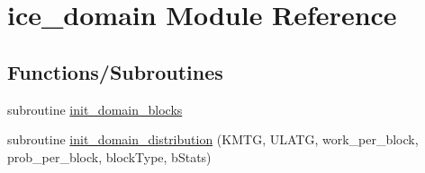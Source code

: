 \hypertarget{namespaceice__domain}{
\section{ice\_\-domain Module Reference}
\label{namespaceice__domain}
}
\subsection*{Functions/Subroutines}
\begin{DoxyCompactItemize}
\item 
subroutine \hyperlink{namespaceice__domain_a110521a564e05165f28b634bd881455c}{init\_\-domain\_\-blocks}
\item 
subroutine \hyperlink{namespaceice__domain_a1beac4cd1574f731cb07cd1f7d20f724}{init\_\-domain\_\-distribution} (KMTG, ULATG, work\_\-per\_\-block, prob\_\-per\_\-block, blockType, bStats)
\end{DoxyCompactItemize}
